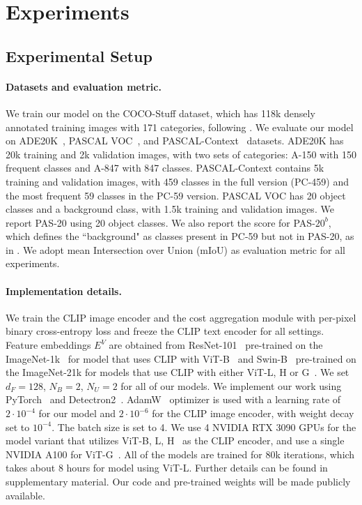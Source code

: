 \documentclass[10pt,twocolumn,letterpaper]{article}
\begin{document}
\section{Experiments}
\subsection{Experimental Setup}
\paragraph{Datasets and evaluation metric.} 
We train our model on the COCO-Stuff dataset, which has 118k densely annotated training images with 171 categories, following \cite{liang2022open}. We evaluate our model on ADE20K~\cite{zhou2019semantic}, PASCAL VOC~\cite{everingham2009pascal}, and PASCAL-Context~\cite{mottaghi2014role} datasets. ADE20K has 20k training and 2k validation images, with two sets of categories: A-150 with 150 frequent classes and A-847 with 847 classes. PASCAL-Context contains 5k training and validation images, with 459 classes in the full version (PC-459) and the most frequent 59 classes in the PC-59 version. PASCAL VOC has 20 object classes and a background class, with 1.5k training and validation images. We report PAS-20 using 20 object classes. We also report the score for PAS-$20^b$, which defines the ``background" as classes present in PC-59 but not in PAS-20, as in \cite{ghiasi2022scaling}. We adopt mean Intersection over Union (mIoU) as evaluation metric for all experiments.

\vspace{-10pt}
\paragraph{Implementation details.}
We train the CLIP image encoder and the cost aggregation module with per-pixel binary cross-entropy loss and freeze the CLIP text encoder for all settings.
Feature embeddings $E^V$ are obtained from ResNet-101~\cite{he2016deep} pre-trained on the ImageNet-1k~\cite{deng2009imagenet} for model that uses CLIP with ViT-B~\cite{dosovitskiy2020image} and Swin-B~\cite{liu2021swin} pre-trained on the ImageNet-21k for models that use CLIP with either ViT-L, H or G~\cite{zhai2022scaling}.
We set $d_F=128$, $N_B=2$, $N_U=2$ for all of our models.
We implement our work using PyTorch~\cite{paszke2019pytorch} and Detectron2~\cite{wu2019detectron2}. AdamW~\cite{loshchilov2017decoupled} 
optimizer is used with a learning rate of $2\cdot10^{-4}$ for our model  and $2\cdot10^{-6}$ for the CLIP image encoder, with weight decay set to $10^{-4}$. The batch size is set to 4. We use 4 NVIDIA RTX 3090 GPUs for the model variant that utilizes ViT-B, L, H~\cite{dosovitskiy2020image} as the CLIP encoder, and use a single NVIDIA A100 for ViT-G~\cite{zhai2022scaling}. All of the models are trained for 80k iterations, which takes about 8 hours for model using ViT-L. Further details can be found in supplementary material. Our code and pre-trained weights will be made publicly available.
\end{document}
